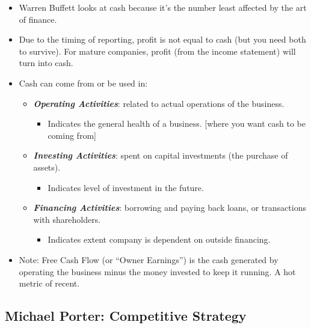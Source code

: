 \documentclass[
]{article}
\providecommand{\tightlist}{%
  \setlength{\itemsep}{0pt}\setlength{\parskip}{0pt}}
\begin{document}
\begin{itemize}
\item
  Warren Buffett looks at cash because it's the number least affected by
  the art of finance.
\item
  Due to the timing of reporting, profit is not equal to cash (but you
  need both to survive). For mature companies, profit (from the income
  statement) will turn into cash.
\item
  Cash can come from or be used in:

  \begin{itemize}
  \item
    \textbf{\emph{Operating Activities}}: related to actual operations
    of the business.

    \begin{itemize}
    \tightlist
    \item
      Indicates the general health of a business. {[}where you want cash
      to be coming from{]}
    \end{itemize}
  \item
    \textbf{\emph{Investing Activities}}: spent on capital investments
    (the purchase of assets).

    \begin{itemize}
    \tightlist
    \item
      Indicates level of investment in the future.
    \end{itemize}
  \item
    \textbf{\emph{Financing Activities}}: borrowing and paying back
    loans, or transactions with shareholders.

    \begin{itemize}
    \tightlist
    \item
      Indicates extent company is dependent on outside financing.
    \end{itemize}
  \end{itemize}
\item
  Note: Free Cash Flow (or ``Owner Earnings'') is the cash generated by
  operating the business minus the money invested to keep it running. A
  hot metric of recent.
\end{itemize}

\hypertarget{michael-porter-competitive-strategy}{%
\subsection{Michael Porter: Competitive
Strategy}\label{michael-porter-competitive-strategy}}
\end{document}
